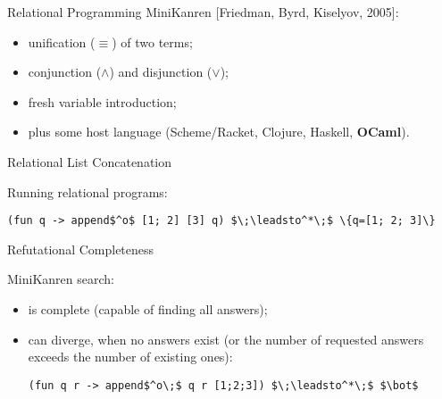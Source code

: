 \documentclass[final,20pt]{beamer}
\begin{document}
\begin{frame}[t]
\begin{columns}[t]
\begin{column}{\onecolwid}
\begin{block}{Relational Programming}
      MiniKanren [Friedman, Byrd, Kiselyov, 2005]: %

      \begin{itemize}
        \item unification ($\equiv$) of two terms;
        \item conjunction ($\wedge$) and disjunction ($\vee$);
        \item fresh variable introduction;
        \item plus some host language (Scheme/Racket, Clojure, Haskell, \textbf{OCaml}).
      \end{itemize}
      
      \begin{exampleblock}{Relational List Concatenation}
        
      \end{exampleblock}
      \vskip7mm
      Running relational programs:

      \bigskip
      \begin{center}
      \lstinline|(fun q -> append$^o$ [1; 2] [3] q) $\;\leadsto^*\;$ \{q=[1; 2; 3]\}|
      \end{center}
      \bigskip
    \end{block}
    
    \begin{block}{Refutational Completeness}
      \vskip7mm

      MiniKanren search:
      \begin{itemize}
         \justifying
         \item is complete (capable of finding all answers); 
         \item can diverge, when no answers exist (or the number of 
         requested answers exceeds the number of existing ones):
         \begin{center}
            \lstinline|(fun q r -> append$^o\;$ q r [1;2;3]) $\;\leadsto^*\;$ $\bot$|
         \end{center}
      \end{itemize}


\end{block}
\end{column}
\end{columns}
\end{frame}
\end{document}
